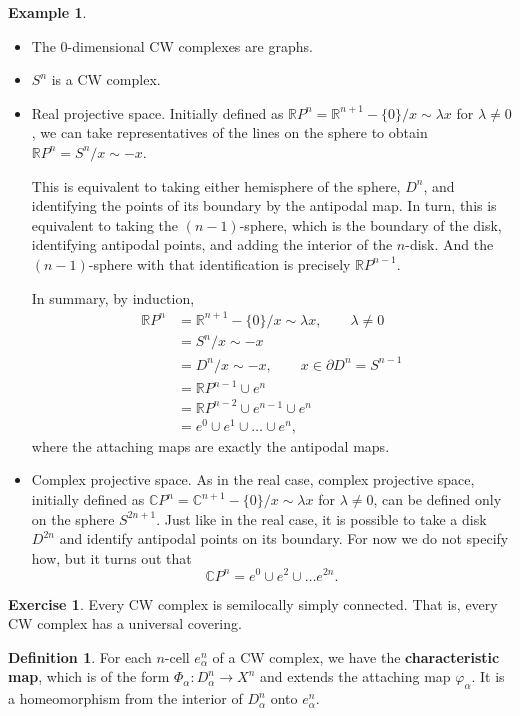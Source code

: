 \documentclass{book}
\theoremstyle{definition}
\newtheorem*{defn}{Definition}
\newtheorem*{ejer}{Exercise}
\newtheorem*{ejem}{Example}
\newcommand{\R}{\mathbb{R}}
\newcommand{\C}{\mathbb{C}}
\begin{document}
\begin{ejem}\leavevmode
\begin{itemize}
\item The 0-dimensional CW complexes are graphs.
\item $S^n$ is a CW complex.
\item Real projective space. Initially defined as
$\R P^n=\R^{n+1}-\{0\}/x\sim\lambda x$ for $\lambda\neq0$,
we can take representatives of the lines on the sphere to
obtain $\R P^n=S^n/x\sim -x$.

This is equivalent to taking either hemisphere of the sphere,
$D^n$, and identifying the points of its boundary by the
antipodal map. In turn, this is equivalent to taking the
$(n-1)$-sphere, which is the boundary of the disk,
identifying antipodal points, and adding the interior of the
$n$-disk. And the $(n-1)$-sphere with that identification is
precisely $\R P^{n-1}$.

In summary, by induction,
$$
\begin{aligned}
\R P^n
&=\R^{n+1}-\{0\}/x\sim\lambda x,
\qquad\lambda\neq0\\
&=S^n/x\sim-x\\
&=D^n/x\sim-x,
\qquad x\in\partial D^n=S^{n-1}\\
&=\R P^{n-1}\cup e^n\\
&=\R P^{n-2}\cup e^{n-1}\cup e^n\\
&=e^0\cup e^1\cup\ldots\cup e^n,
\end{aligned}
$$
where the attaching maps are exactly the antipodal maps.
\item Complex projective space. As in the real case, complex
projective space, initially defined as
$\C P^n=\C^{n+1}-\{0\}/x\sim\lambda x$ for $\lambda\neq0$,
can be defined only on the sphere $S^{2n+1}$. Just like in
the real case, it is possible to take a disk $D^{2n}$ and
identify antipodal points on its boundary. For now we do not
specify how, but it turns out that
$$
\C P^n=e^0\cup e^2\cup\ldots e^{2n}.
$$
\end{itemize}
\end{ejem}

\begin{ejer}
Every CW complex is semilocally simply connected. That is,
every CW complex has a universal covering.
\end{ejer}

\begin{defn}
For each $n$-cell $e^n_\alpha$ of a CW complex, we have the
\textbf{characteristic map}, which is of the form
$\Phi_\alpha:D^n_\alpha\to X^n$ and extends the attaching map
$\varphi_\alpha$. It is a homeomorphism from the interior of
$D^n_\alpha$ onto $e^n_\alpha$.
\end{defn}
\end{document}
